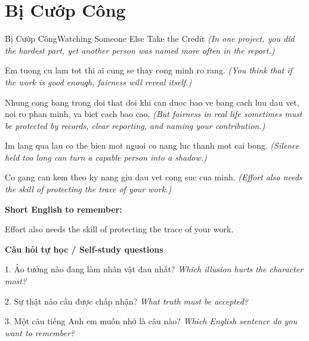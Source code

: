 \section{Bị Cướp Công}
\begin{truyen}{Bị Cướp Công}{Watching Someone Else Take the Credit}
\textit{(In one project, you did the hardest part, yet another person was named more often in the report.)}

Em tuong cu lam tot thi ai cung se thay cong minh ro rang.
\textit{(You think that if the work is good enough, fairness will reveal itself.)}

Nhung cong bang trong doi that doi khi can duoc bao ve bang cach luu dau vet, noi ro phan minh, va biet cach bao cao.
\textit{(But fairness in real life sometimes must be protected by records, clear reporting, and naming your contribution.)}

Im lang qua lau co the bien mot nguoi co nang luc thanh mot cai bong.
\textit{(Silence held too long can turn a capable person into a shadow.)}

\end{truyen}

\begin{baihoc}
Co gang can kem theo ky nang giu dau vet cong suc cua minh.
\textit{(Effort also needs the skill of protecting the trace of your work.)}
\end{baihoc}

\begin{ghinhoanh}
\textbf{Short English to remember:}

Effort also needs the skill of protecting the trace of your work.

\end{ghinhoanh}

\begin{tuhocnhanh}
\textbf{Câu hỏi tự học / Self-study questions}

1. Ảo tưởng nào đang làm nhân vật đau nhất? \textit{Which illusion hurts the character most?}

2. Sự thật nào cần được chấp nhận? \textit{What truth must be accepted?}

3. Một câu tiếng Anh em muốn nhớ là câu nào? \textit{Which English sentence do you want to remember?}
\end{tuhocnhanh}
\ngancach

